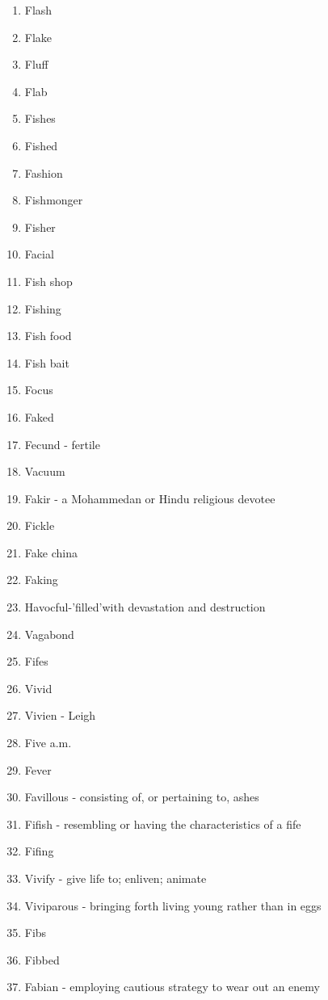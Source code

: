 \begin{enumerate}
        \item Flash
        \item Flake
        \item Fluff
        \item Flab
        \item Fishes
        \item Fished
        \item Fashion
        \item Fishmonger
        \item Fisher
        \item Facial
        \item Fish shop
        \item Fishing
        \item Fish food
        \item Fish bait
        \item Focus
        \item Faked
        \item Fecund - fertile
        \item Vacuum
        \item Fakir - a Mohammedan or Hindu religious devotee
        \item Fickle
        \item Fake china
        \item Faking
        \item Havocful-'filled'with devastation and destruction
        \item Vagabond
        \item Fifes
        \item Vivid
        \item Vivien - Leigh
        \item Five a.m.
        \item Fever
        \item Favillous - consisting of, or pertaining to, ashes
        \item Fifish - resembling or having the characteristics of a fife
        \item Fifing
        \item Vivify - give life to; enliven; animate
        \item Viviparous - bringing forth living young rather than in eggs
        \item Fibs
        \item Fibbed
        \item Fabian - employing cautious strategy to wear out an enemy

\end{enumerate}
